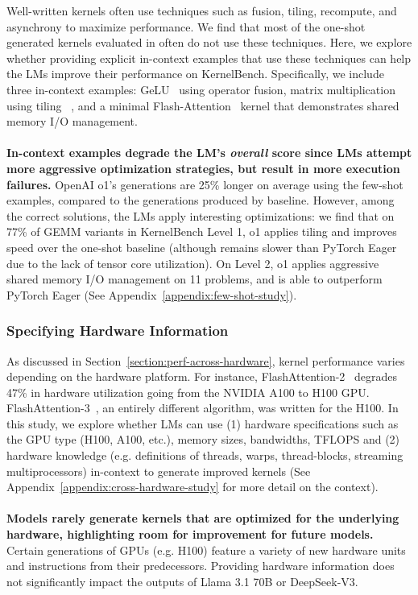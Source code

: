 Well-written kernels often use techniques such as fusion, tiling, recompute, and asynchrony to maximize performance. We find that most of the one-shot generated kernels evaluated in  often do not use these techniques. Here, we explore whether providing explicit in-context examples that use these techniques can help the LMs improve their performance on KernelBench. Specifically, we include three in-context examples: GeLU~\cite{hendrycks2023gaussianerrorlinearunits} using operator fusion, matrix multiplication using tiling ~\cite{mills2024cuda}, and a minimal Flash-Attention~\cite{dao2022flashattention, kim2024flashattention} kernel that demonstrates shared memory I/O management.
\\\\
\noindent \textbf{In-context examples degrade the LM's \textit{overall}  score since LMs attempt more aggressive optimization strategies, but result in more execution failures.} OpenAI o1's generations are 25\% longer on average using the few-shot examples, compared to the generations produced by  baseline. However, among the correct solutions, the LMs apply interesting optimizations: we find that on 77\% of GEMM variants in KernelBench Level 1, o1 applies tiling and improves speed over the one-shot baseline (although remains slower than PyTorch Eager due to the lack of tensor core utilization). On Level 2, o1 applies aggressive shared memory I/O management on 11 problems, and is able to outperform PyTorch Eager (See Appendix~\ref{appendix:few-shot-study}).

\subsubsection{Specifying Hardware Information} 
\label{subsection:hardware-prompting-study}
As discussed in Section~\ref{section:perf-across-hardware}, kernel performance varies depending on the hardware platform. For instance, FlashAttention-2~\cite{dao2023flashattention2} degrades 47\% in hardware utilization going from the NVIDIA A100 to H100 GPU. FlashAttention-3~\cite{dao2024flashattention3}, an entirely different algorithm, was written for the H100. In this study, we explore whether LMs can use (1) hardware specifications such as the GPU type (H100, A100, etc.), memory sizes, bandwidths, TFLOPS and (2) hardware knowledge (e.g. definitions of threads, warps, thread-blocks, streaming multiprocessors) in-context to generate improved kernels (See Appendix~\ref{appendix:cross-hardware-study} for more detail on the context). 
\\\\
\noindent \textbf{Models rarely generate kernels that are optimized for the underlying hardware, highlighting room for improvement for future models.} Certain generations of GPUs (e.g. H100) feature a variety of new hardware units and instructions from their predecessors. Providing hardware information does not significantly impact the outputs of Llama 3.1 70B or DeepSeek-V3. 

